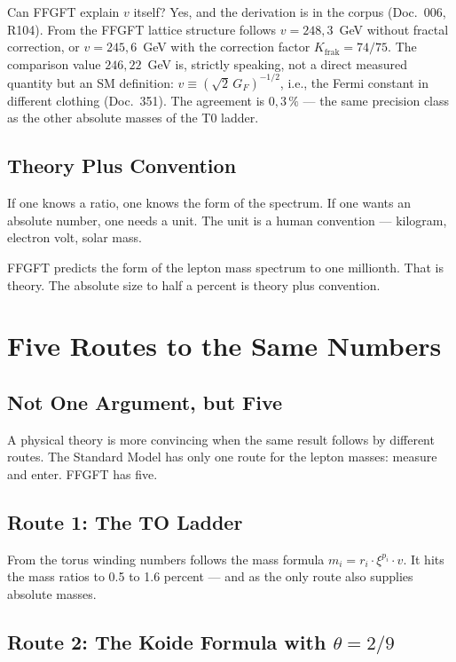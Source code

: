 \documentclass[12pt,oneside]{book}
\begin{document}
Can FFGFT explain $v$ itself? Yes, and the derivation is in the corpus (Doc.~006, R104). From the FFGFT lattice structure follows $v = 248{,}3$~GeV without fractal cor\-rection, or $v = 245{,}6$~GeV with the correction factor $K_\text{frak} = 74/75$. The comparison value $246{,}22$~GeV is, strictly speaking, not a direct measured quantity but an SM definition: $v \equiv (\sqrt{2}\,G_F)^{-1/2}$, i.e., the Fermi constant in different clothing (Doc.~351). The agreement is $0{,}3\,\%$ --- the same precision class as the other absolute masses of the T0 ladder.

\section{Theory Plus Convention}

If one knows a ratio, one knows the form of the spectrum. If one wants an absolute number, one needs a unit. The unit is a human convention --- kilogram, electron volt, solar mass.

FFGFT predicts the form of the lepton mass spectrum to one millionth. That is theory. The absolute size to half a percent is theory plus convention.

\chapter{Five Routes to the Same Numbers}

\section{Not One Argument, but Five}

A physical theory is more convincing when the same result follows by different routes. The Standard Model has only one route for the lepton masses: measure and enter. FFGFT has five.

\section{Route 1: The TO Ladder}

From the torus winding numbers follows the mass formula $m_i = r_i \cdot \xi^{p_i} \cdot v$. It hits the mass ratios to 0.5 to 1.6 percent --- and as the only route also supplies absolute masses.

\section{Route 2: The Koide Formula with $\theta = 2/9$}
\end{document}
